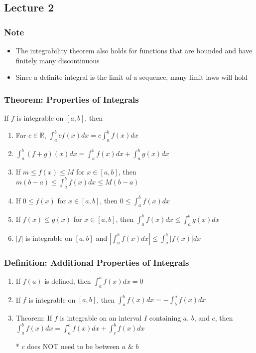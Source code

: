 \documentclass[12pt, letterpaper]{article}
\begin{document}
\subsection{Lecture 2}
\subsubsection*{Note}
\begin{itemize}
    \item The integrability theorem also holds for functions that are bounded and have finitely many discontinuous
    \item Since a definite integral is the limit of a sequence, many limit laws will hold
\end{itemize}
\subsubsection{Theorem: Properties of Integrals}
If $f$ is integrable on $[a,b]$, then
\begin{enumerate}
    \item For $c\in\mathbb{R}$, $\displaystyle\int_{a}^{b}cf(x)dx = c\int_{a}^{b}f(x)dx$
    \item $\displaystyle\int_{a}^{b}(f+g)(x)dx = \int_{a}^{b}f(x)dx + \int_{a}^{b}g(x)dx$
    \item If $m\leq f(x)\leq M$ for $x\in[a,b]$, then $m(b-a) \leq \displaystyle\int_{a}^{b}f(x)dx \leq M(b-a)$
    \item If $0\leq f(x)$ for $x\in[a,b]$, then $0\leq \displaystyle\int_{a}^{b}f(x)dx$
    \item If $f(x)\leq g(x)$ for $x\in[a,b]$, then $\displaystyle\int_{a}^{b}f(x)dx \leq \int_{a}^{b}g(x)dx$
    \item $|f|$ is integrable on $[a,b]$ and $\displaystyle|\int_{a}^{b}f(x)dx|\leq \int_{a}^{b}|f(x)|dx$
\end{enumerate}
\subsubsection{Definition: Additional Properties of Integrals}
\begin{enumerate}
    \item If $f(a)$ is defined, then $\displaystyle\int_{a}^{a}f(x)dx = 0$
    \item If $f$ is integrable on $[a,b]$, then $\displaystyle\int_{a}^{b}f(x)dx = -\int_{b}^{a}f(x)dx$
    \item Theorem: If $f$ is integrable on an interval $I$ containing $a$, $b$, and $c$, then $\displaystyle\int_{a}^{b}f(x)dx = \int_{a}^{c}f(x)dx + \int_{c}^{b}f(x)dx$
    \item[*] $c$ does NOT need to be between $a$ $\&$ $b$
\end{enumerate}
\end{document}
